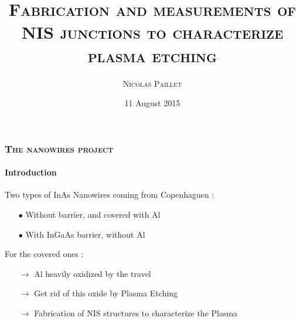\documentclass[handout]{beamer}
\title[\textsc{Fabrication and measurements of NIS junctions}]{\textsc{Fabrication and measurements of\\NIS junctions to characterize\\plasma etching}}
\author{\textsc{Nicolas Paillet}}
\institute{Aalto University}
\date{11 August 2015}
\begin{document}
    \begin{frame}
        \titlepage
    \end{frame}

    
    \begin{frame}
        \frametitle{\textsc{The nanowires project}}
        \framesubtitle{Introduction}
        Two types of InAs Nanowires coming from Copenhaguen :
        
        \begin{itemize}
            \item[$\bullet$]{Without barrier, and covered with Al}
            \item[$\bullet$]{With InGaAs barrier, without Al} 
        \end{itemize}
         
        For the covered ones :
        \begin{itemize}        
        \item[$\longrightarrow$] {Al heavily oxidized by the travel}
        \item[$\longrightarrow$] {Get rid of this oxide by Plasma Etching}
        \item[$\longrightarrow$] {Fabrication of NIS structures to characterize the Plasma}
        \end{itemize}
    \end{frame}
\end{document}
